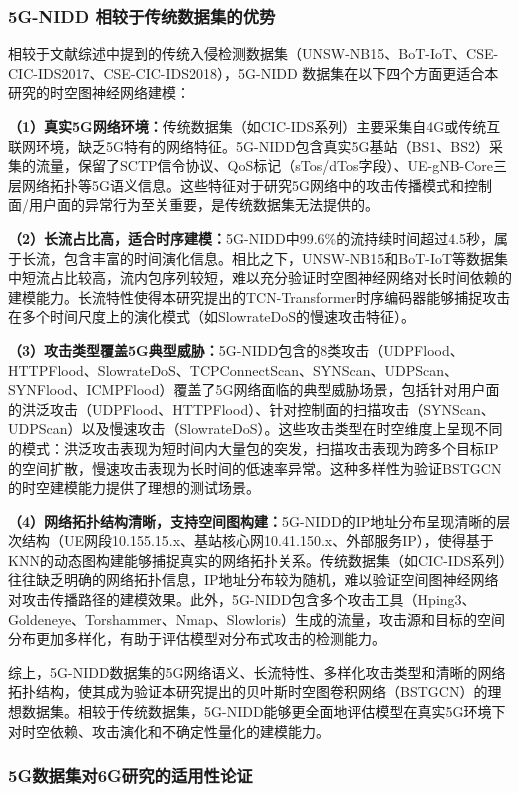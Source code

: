 \subsubsection{5G-NIDD 相较于传统数据集的优势}

相较于文献综述中提到的传统入侵检测数据集（UNSW-NB15、BoT-IoT、CSE-CIC-IDS2017、CSE-CIC-IDS2018），5G-NIDD 数据集在以下四个方面更适合本研究的时空图神经网络建模：

\textbf{（1）真实5G网络环境：}传统数据集（如CIC-IDS系列）主要采集自4G或传统互联网环境，缺乏5G特有的网络特征。5G-NIDD包含真实5G基站（BS1、BS2）采集的流量，保留了SCTP信令协议、QoS标记（sTos/dTos字段）、UE-gNB-Core三层网络拓扑等5G语义信息。这些特征对于研究5G网络中的攻击传播模式和控制面/用户面的异常行为至关重要，是传统数据集无法提供的。

\textbf{（2）长流占比高，适合时序建模：}5G-NIDD中99.6\%的流持续时间超过4.5秒，属于长流，包含丰富的时间演化信息。相比之下，UNSW-NB15和BoT-IoT等数据集中短流占比较高，流内包序列较短，难以充分验证时空图神经网络对长时间依赖的建模能力。长流特性使得本研究提出的TCN-Transformer时序编码器能够捕捉攻击在多个时间尺度上的演化模式（如SlowrateDoS的慢速攻击特征）。

\textbf{（3）攻击类型覆盖5G典型威胁：}5G-NIDD包含的8类攻击（UDPFlood、HTTPFlood、SlowrateDoS、TCPConnectScan、SYNScan、UDPScan、SYNFlood、ICMPFlood）覆盖了5G网络面临的典型威胁场景，包括针对用户面的洪泛攻击（UDPFlood、HTTPFlood）、针对控制面的扫描攻击（SYNScan、UDPScan）以及慢速攻击（SlowrateDoS）。这些攻击类型在时空维度上呈现不同的模式：洪泛攻击表现为短时间内大量包的突发，扫描攻击表现为跨多个目标IP的空间扩散，慢速攻击表现为长时间的低速率异常。这种多样性为验证BSTGCN的时空建模能力提供了理想的测试场景。

\textbf{（4）网络拓扑结构清晰，支持空间图构建：}5G-NIDD的IP地址分布呈现清晰的层次结构（UE网段10.155.15.x、基站核心网10.41.150.x、外部服务IP），使得基于KNN的动态图构建能够捕捉真实的网络拓扑关系。传统数据集（如CIC-IDS系列）往往缺乏明确的网络拓扑信息，IP地址分布较为随机，难以验证空间图神经网络对攻击传播路径的建模效果。此外，5G-NIDD包含多个攻击工具（Hping3、Goldeneye、Torshammer、Nmap、Slowloris）生成的流量，攻击源和目标的空间分布更加多样化，有助于评估模型对分布式攻击的检测能力。

综上，5G-NIDD数据集的5G网络语义、长流特性、多样化攻击类型和清晰的网络拓扑结构，使其成为验证本研究提出的贝叶斯时空图卷积网络（BSTGCN）的理想数据集。相较于传统数据集，5G-NIDD能够更全面地评估模型在真实5G环境下对时空依赖、攻击演化和不确定性量化的建模能力。

\subsubsection{5G数据集对6G研究的适用性论证}

